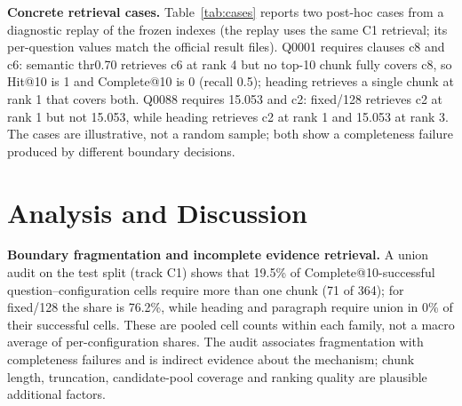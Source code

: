 \documentclass[conference]{IEEEtran}
\begin{document}
\begin{table}[t]
\centering
\caption{Concrete retrieval cases (C1, test split, top-10). Diagnostic replay of the frozen indexes; Hit@10, Complete@10 and Recall@10 match the official C1 per-question records.}
\label{tab:cases}
\small
{}
\end{table}

\textbf{Concrete retrieval cases.}
Table~\ref{tab:cases} reports two post-hoc cases from a diagnostic replay of the frozen indexes
(the replay uses the same C1 retrieval; its per-question values match the official result files).
Q0001 requires clauses c8 and c6: semantic thr0.70 retrieves c6 at rank 4 but no top-10 chunk fully
covers c8, so Hit@10 is 1 and Complete@10 is 0 (recall 0.5); heading retrieves a single chunk at
rank 1 that covers both. Q0088 requires 15.053 and c2: fixed/128 retrieves c2 at rank 1 but not
15.053, while heading retrieves c2 at rank 1 and 15.053 at rank 3. The cases are illustrative, not
a random sample; both show a completeness failure produced by different boundary decisions.

\section{Analysis and Discussion}
\textbf{Boundary fragmentation and incomplete evidence retrieval.}
A union audit on the test split (track C1) shows that 19.5\% of Complete@10-successful question--configuration cells require more than one chunk (71 of 364); for fixed/128 the share is 76.2\%, while heading and paragraph require union in 0\% of their successful cells. These are pooled cell counts within each family, not a macro average of per-configuration shares. The audit associates fragmentation with completeness failures and is indirect evidence about the mechanism; chunk length, truncation, candidate-pool coverage and ranking quality are plausible additional factors.
\end{document}
